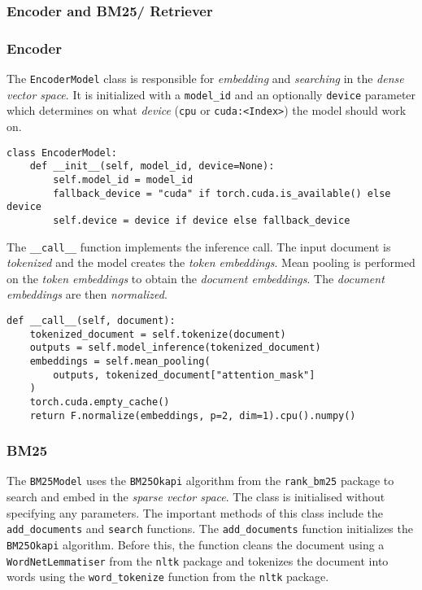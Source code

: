 \documentclass{article}
\begin{document}
\subsubsection{Encoder and BM25/ Retriever}
\subsubsection*{Encoder}
The \colorbox{lightgray!25}{\lstinline|EncoderModel|} class is responsible for \textit{embedding} and \textit{searching} in the \textit{dense vector space}. It is initialized with a \colorbox{lightgray!25}{\lstinline{model_id}} and an optionally \colorbox{lightgray!25}{\lstinline{device}} parameter which determines on what \textit{device} (\colorbox{lightgray!25}{\lstinline{cpu}} or \colorbox{lightgray!25}{\lstinline{cuda:<Index>}}) the model should work on.

\begin{lstlisting}[backgroundcolor = \color{lightgray!25}]
class EncoderModel:
    def __init__(self, model_id, device=None):
        self.model_id = model_id
        fallback_device = "cuda" if torch.cuda.is_available() else device
        self.device = device if device else fallback_device
\end{lstlisting}

The \colorbox{lightgray!25}{\lstinline{__call__}} function implements the inference call.  The input document is \textit{tokenized} and the model creates the \textit{token embeddings}. Mean pooling is performed on the \textit{token embeddings} to obtain the \textit{document embeddings}. The \textit{document embeddings} are then \textit{normalized}.

\begin{lstlisting}[backgroundcolor = \color{lightgray!25}]
def __call__(self, document):
    tokenized_document = self.tokenize(document)
    outputs = self.model_inference(tokenized_document)
    embeddings = self.mean_pooling(
        outputs, tokenized_document["attention_mask"]
    )
    torch.cuda.empty_cache()
    return F.normalize(embeddings, p=2, dim=1).cpu().numpy()
\end{lstlisting}

\subsubsection*{BM25}
The \colorbox{lightgray!25}{\lstinline{BM25Model}} uses the \colorbox{lightgray!25}{\lstinline{BM25Okapi}} algorithm from the \colorbox{lightgray!25}{\lstinline{rank_bm25}} package to search and embed in the \textit{sparse vector space}. The class is initialised without specifying any parameters. The important methods of this class include the \colorbox{lightgray!25}{\lstinline{add_documents}} and \colorbox{lightgray!25}{\lstinline{search}} functions. The \colorbox{lightgray!25}{\lstinline{add_documents}} function initializes the \colorbox{lightgray!25}{\lstinline{BM25Okapi}} algorithm. Before this, the function cleans the document using a \colorbox{lightgray!25}{\lstinline{WordNetLemmatiser}} from the \colorbox{lightgray!25}{\lstinline{nltk}} package and tokenizes the document into words using the \colorbox{lightgray!25}{\lstinline{word_tokenize}} function from the \colorbox{lightgray!25}{\lstinline{nltk}} package.
\end{document}
